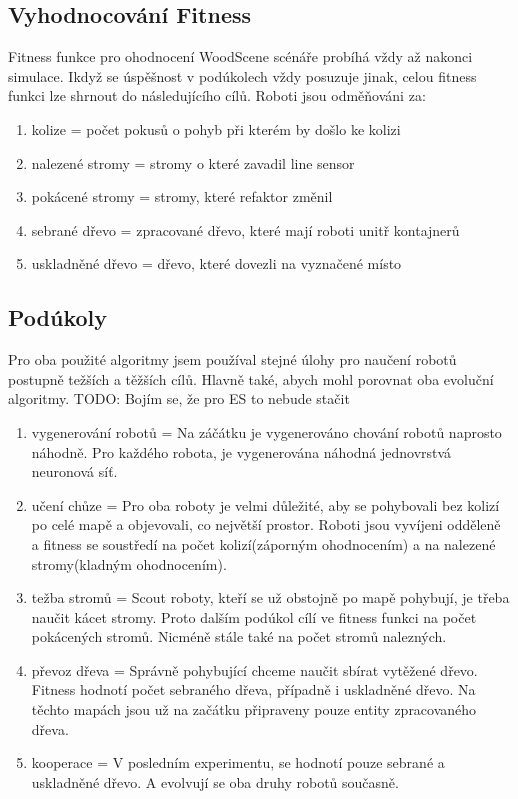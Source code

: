 \subsection{Vyhodnocování Fitness}
Fitness funkce pro ohodnocení WoodScene scénáře probíhá vždy až nakonci simulace. Ikdyž se úspěšnost v podúkolech  vždy posuzuje jinak, celou fitness funkci lze shrnout do následujícího cílů. Roboti jsou odměňováni za: 
\begin{enumerate}
        \item kolize = počet pokusů o pohyb při kterém by došlo ke kolizi 
        \item nalezené stromy = stromy o které zavadil line sensor 
        \item pokácené stromy = stromy, které refaktor změnil 
        \item sebrané dřevo = zpracované dřevo, které mají roboti unitř kontajnerů 
        \item uskladněné dřevo = dřevo, které dovezli na vyznačené místo 
\end{enumerate}

\subsection{Podúkoly} 
Pro oba použité algoritmy jsem používal stejné úlohy pro naučení robotů postupně težších a těžších cílů. Hlavně také, abych mohl porovnat oba evoluční algoritmy. TODO: Bojím se, že pro ES to nebude stačit 
\begin{enumerate}
        \item vygenerování robotů = Na záčátku je vygenerováno chování robotů naprosto náhodně. Pro každého robota, je vygenerována náhodná jednovrstvá neuronová síť. 
        \item učení chůze = Pro oba roboty je velmi důležité, aby se pohybovali bez kolizí po celé mapě a objevovali, co největší prostor. Roboti jsou vyvíjeni odděleně a fitness se soustředí na počet kolizí(záporným ohodnocením) a na nalezené stromy(kladným ohodnocením).
        \item težba stromů = Scout roboty, kteří se už obstojně po mapě pohybují, je třeba naučit kácet stromy. Proto dalším podúkol cílí ve fitness funkci na počet pokácených stromů. Nicméně stále také na počet stromů nalezných. 
        \item převoz dřeva = Správně pohybující chceme naučit sbírat vytěžené dřevo. Fitness hodnotí počet sebraného dřeva, případně i uskladněné dřevo. Na těchto mapách jsou už na začátku připraveny pouze entity zpracovaného dřeva.
        \item kooperace = V posledním experimentu, se hodnotí pouze sebrané a uskladněné dřevo. A evolvují se oba druhy robotů současně. 
\end{enumerate}

